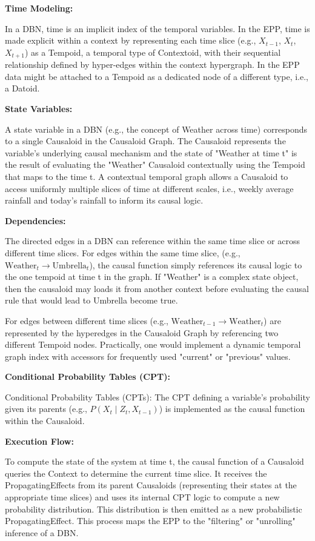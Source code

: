  \textbf{Time Modeling:}
 
 In a DBN, time is an implicit index of the temporal variables. In the EPP, time is made explicit within a
 context by representing each time slice (e.g., $X_{t-1}$, $X_t$, $X_{t+1}$) as a Tempoid, a temporal type of Contextoid, with their sequential relationship defined by hyper-edges within the context hypergraph. In the EPP data might be attached to a Tempoid as a dedicated node of a different type, i.e., a Datoid. 

 \textbf{State Variables:}
 
A state variable in a DBN (e.g., the concept of Weather across time) corresponds to a single Causaloid in the Causaloid Graph. The Causaloid represents the variable's underlying causal mechanism and the state of "Weather at time t" is the result of evaluating the "Weather" Causaloid contextually using the Tempoid that maps to the time t. A contextual temporal graph allows a Causaloid to access uniformly multiple slices of time at different scales, i.e., weekly average rainfall and today's rainfall to inform its causal logic. 

\textbf{Dependencies:}

The directed edges in a DBN can reference within the same time slice or across different time slices.
For edges within the same time slice, (e.g., $\text{Weather}_t \to \text{Umbrella}_t$), the causal function simply references its causal logic to the one tempoid at time t in the graph. If "Weather" is a complex state object, then the causaloid may loads it from another context before evaluating the causal rule that would lead to Umbrella become true.

For edges between different time slices (e.g., $\text{Weather}_{t-1} \to \text{Weather}_t$) are represented by the hyperedges in the Causaloid Graph by referencing two different Tempoid nodes. Practically, one would implement a dynamic temporal graph index with accessors for frequently used "current" or "previous" values. 


\textbf{Conditional Probability Tables (CPT):}

Conditional Probability Tables (CPTs): The CPT defining a variable's probability given its parents
(e.g., $P(X_t \mid Z_t, X_{t-1})$) is implemented as the causal function within the Causaloid.


\textbf{Execution Flow:}

To compute the state of the system at time t, the causal function of a Causaloid queries the Context to determine the current time slice. It receives the PropagatingEffects from its parent Causaloids (representing their states at the appropriate time slices) and uses its internal CPT logic to compute a new probability distribution. This distribution is then emitted as a new probabilistic PropagatingEffect. This process maps the EPP to the "filtering" or "unrolling" inference of a DBN.
%
%
